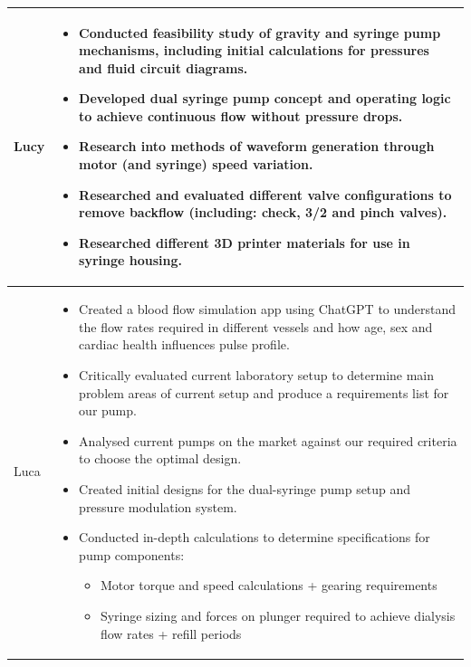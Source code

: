 \documentclass[10pt, a4paper]{article}
\begin{document}
\begin{table}[H]
\begin{tabularx}{\linewidth}{>{\raggedright\arraybackslash}p{1.5cm} X}
        \midrule
        Lucy
                      & \begin{itemize}[nosep, leftmargin=*]
                            \item Conducted feasibility study of gravity and syringe pump mechanisms, including initial calculations for pressures and fluid circuit diagrams.
                            \item Developed dual syringe pump concept and operating logic to achieve continuous flow without pressure drops.
                            \item Research into methods of waveform generation through motor (and syringe) speed variation.
                            \item Researched and evaluated different valve configurations to remove backflow (including: check, 3/2 and pinch valves).
                            \item Researched different 3D printer materials for use in syringe housing.
                        \end{itemize}                                 \\
        \midrule
        Luca
                      & \begin{itemize}[nosep, leftmargin=*]
                            \item Created a blood flow simulation app using ChatGPT to understand the flow rates required in different vessels and how age, sex and cardiac health influences pulse profile.
                            \item Critically evaluated current laboratory setup to determine main problem areas of current setup and produce a requirements list for our pump.
                            \item Analysed current pumps on the market against our required criteria to choose the optimal design.
                            \item Created initial designs for the dual-syringe pump setup and pressure modulation system.
                            \item Conducted in-depth calculations to determine specifications for pump components:
                                  \begin{itemize}[nosep, leftmargin=*]
                      \item Motor torque and speed calculations + gearing requirements
                      \item Syringe sizing and forces on plunger required to achieve dialysis flow rates + refill periods

\end{itemize}
\end{itemize}
\end{tabularx}
\end{table}
\end{document}
